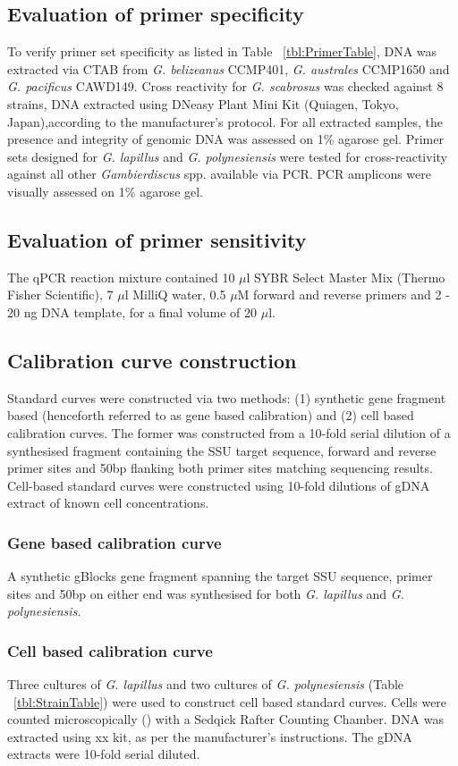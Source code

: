 \documentclass[12pt]{article}
\begin{document}
\subsection{Evaluation of primer specificity}
To verify primer set specificity as listed in Table ~\ref{tbl:PrimerTable}, DNA was extracted via CTAB from \emph{G. belizeanus} CCMP401, \emph{G. australes} CCMP1650 and \emph{G. pacificus} CAWD149. Cross reactivity for \emph{G. scabrosus} was checked against 8 strains, DNA extracted using DNeasy Plant Mini Kit (Quiagen, Tokyo, Japan),according to the manufacturer's protocol. For all extracted samples, the presence and integrity of genomic DNA was  assessed on 1\% agarose gel. Primer sets designed for \emph{G. lapillus} and \emph{G. polynesiensis} were tested for cross-reactivity against all other \emph{Gambierdiscus} spp. available via PCR. PCR amplicons were visually assessed on 1\% agarose gel.

\subsection{Evaluation of primer sensitivity}
 The qPCR reaction mixture contained 10 $\mu$l SYBR Select Master Mix (Thermo Fisher Scientific), 7 $\mu$l MilliQ water, 0.5 $\mu$M forward and reverse primers and 2 - 20 ng DNA template, for a final volume of 20 $\mu$l.

\subsection{Calibration curve construction}
Standard curves were constructed via two methods: (1) synthetic gene fragment based (henceforth referred to as gene based calibration) and (2) cell based calibration curves. The former was constructed from a 10-fold serial dilution of a synthesised fragment containing the SSU target sequence, forward and reverse primer sites and 50bp flanking both primer sites matching sequencing results. Cell-based standard curves were constructed using 10-fold dilutions of gDNA extract of known cell concentrations.
\subsubsection{Gene based calibration curve}
A synthetic gBlocks gene fragment spanning the target SSU sequence, primer sites and 50bp on either end was synthesised for both \emph{G. lapillus} and \emph{G. polynesiensis}.
\subsubsection{Cell based calibration curve}
Three cultures of \emph{G. lapillus} and two cultures of \emph{G. polynesiensis} (Table ~\ref{tbl:StrainTable}) were used to construct cell based standard curves. Cells were counted microscopically () with a Sedqick Rafter Counting Chamber. DNA was extracted using xx kit, as per the manufacturer's instructions. The gDNA extracts were 10-fold serial diluted.
\end{document}
